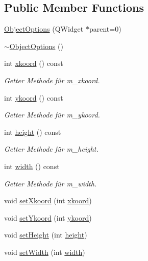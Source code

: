 \subsection*{Public Member Functions}
\begin{DoxyCompactItemize}
\item 
\hyperlink{class_object_options_aec863b929bf4ccba84210b58ab23e530}{Object\+Options} (Q\+Widget $\ast$parent=0)
\item 
\hyperlink{class_object_options_a93a5c0da34ad8420c19b65d76296f9c0}{$\sim$\+Object\+Options} ()
\item 
int \hyperlink{class_object_options_a738e07899e3eff5aeb2f998bf527b804}{xkoord} () const
\begin{DoxyCompactList}\small\item\em Getter Methode für m\+\_\+xkoord. \end{DoxyCompactList}\item 
int \hyperlink{class_object_options_a3306979371a1f706724d2e5a449d3f72}{ykoord} () const
\begin{DoxyCompactList}\small\item\em Getter Methode für m\+\_\+ykoord. \end{DoxyCompactList}\item 
int \hyperlink{class_object_options_af520e91fb7c4980c04e21f1a306264b1}{height} () const
\begin{DoxyCompactList}\small\item\em Getter Methode für m\+\_\+height. \end{DoxyCompactList}\item 
int \hyperlink{class_object_options_a57594cc38acb8ebf466bb41538a35a8b}{width} () const
\begin{DoxyCompactList}\small\item\em Getter Methode für m\+\_\+width. \end{DoxyCompactList}\item 
void \hyperlink{class_object_options_acdb5c1b9952fda67ac8393055acfd756}{set\+Xkoord} (int \hyperlink{class_object_options_a738e07899e3eff5aeb2f998bf527b804}{xkoord})
\item 
void \hyperlink{class_object_options_a32b59030cadbd75a09ed0056df03d342}{set\+Ykoord} (int \hyperlink{class_object_options_a3306979371a1f706724d2e5a449d3f72}{ykoord})
\item 
void \hyperlink{class_object_options_a7e490c997a49ddd45317598dc851f473}{set\+Height} (int \hyperlink{class_object_options_af520e91fb7c4980c04e21f1a306264b1}{height})
\item 
void \hyperlink{class_object_options_a33cd9c2ae781069d22babab1ac346af9}{set\+Width} (int \hyperlink{class_object_options_a57594cc38acb8ebf466bb41538a35a8b}{width})
\end{DoxyCompactItemize}


